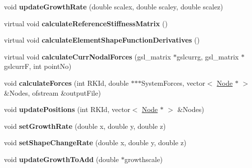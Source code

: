 \begin{DoxyCompactItemize}
\item 
\hypertarget{classShapeBase_ad9ffbae214584cbd0cc1e34f66a8ec5c}{}void {\bfseries update\+Growth\+Rate} (double scalex, double scaley, double scalez)\label{classShapeBase_ad9ffbae214584cbd0cc1e34f66a8ec5c}

\item 
\hypertarget{classShapeBase_a1162e815f80b1b9d58c69df731702ecb}{}virtual void {\bfseries calculate\+Reference\+Stiffness\+Matrix} ()\label{classShapeBase_a1162e815f80b1b9d58c69df731702ecb}

\item 
\hypertarget{classShapeBase_ab86b6c4eef2ea6232dd1d0c300ae5602}{}virtual void {\bfseries calculate\+Element\+Shape\+Function\+Derivatives} ()\label{classShapeBase_ab86b6c4eef2ea6232dd1d0c300ae5602}

\item 
\hypertarget{classShapeBase_afc2e2e90a9352778ba6bf6d547e319bf}{}virtual void {\bfseries calculate\+Curr\+Nodal\+Forces} (gsl\+\_\+matrix $\ast$gslcurrg, gsl\+\_\+matrix $\ast$gslcurr\+F, int point\+No)\label{classShapeBase_afc2e2e90a9352778ba6bf6d547e319bf}

\item 
\hypertarget{classShapeBase_aa5df3f56f90f3026d3732aecf047de70}{}void {\bfseries calculate\+Forces} (int R\+K\+Id, double $\ast$$\ast$$\ast$System\+Forces, vector$<$ \hyperlink{classNode}{Node} $\ast$ $>$ \&Nodes, ofstream \&output\+File)\label{classShapeBase_aa5df3f56f90f3026d3732aecf047de70}

\item 
\hypertarget{classShapeBase_ac323cea68af3b9ca0cfd913222b82e49}{}void {\bfseries update\+Positions} (int R\+K\+Id, vector$<$ \hyperlink{classNode}{Node} $\ast$ $>$ \&Nodes)\label{classShapeBase_ac323cea68af3b9ca0cfd913222b82e49}

\item 
\hypertarget{classShapeBase_ac1ab3fae7adbc8fa015c99fb0d523795}{}void {\bfseries set\+Growth\+Rate} (double x, double y, double z)\label{classShapeBase_ac1ab3fae7adbc8fa015c99fb0d523795}

\item 
\hypertarget{classShapeBase_a164d682fa7804da88cb6b16330b7f404}{}void {\bfseries set\+Shape\+Change\+Rate} (double x, double y, double z)\label{classShapeBase_a164d682fa7804da88cb6b16330b7f404}

\item 
\hypertarget{classShapeBase_acab38ef1a1f72d3df1dec8d6f45d09aa}{}void {\bfseries update\+Growth\+To\+Add} (double $\ast$growthscale)\label{classShapeBase_acab38ef1a1f72d3df1dec8d6f45d09aa}


\end{DoxyCompactItemize}
